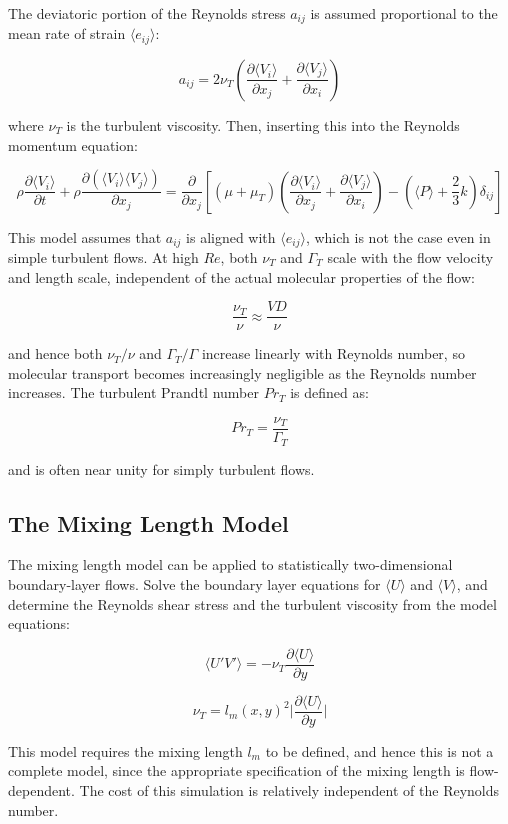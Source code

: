 \documentclass[10pt]{article}
\newcommand{\beq}{\begin{equation}}
\newcommand{\eeq}{\end{equation}}
\newcommand{\la}{\langle}
\newcommand{\ra}{\rangle}
\begin{document}
\begin{flushleft}
The deviatoric portion of the Reynolds stress \(a_{ij}\) is assumed proportional to the mean rate of strain \(\la e_{ij}\ra\):

\beq
a_{ij}=2\nu_T\left(\frac{\partial \la V_i\ra}{\partial x_j}+\frac{\partial \la V_j\ra}{\partial x_i}\right)
\eeq

where \(\nu_T\) is the turbulent viscosity. Then, inserting this into the Reynolds momentum equation:

\beq
\rho\frac{\partial \la V_i\ra}{\partial t}+\rho\frac{\partial(\la V_i\ra\la V_j\ra)}{\partial x_j}=\frac{\partial}{\partial x_j}\left\lbrack(\mu+\mu_T)\left(\frac{\partial\la V_i\ra}{\partial x_j}+\frac{\partial\la V_j\ra}{\partial x_i}\right)-\left(\la P\ra+\frac{2}{3}k\right)\delta_{ij}\right\rbrack
\eeq

This model assumes that \(a_{ij}\) is aligned with \(\la e_{ij}\ra\), which is not the case even in simple turbulent flows. At high \(Re\), both \(\nu_T\) and \(\Gamma_T\) scale with the flow velocity and length scale, independent of the actual molecular properties of the flow:

\beq
\frac{\nu_T}{\nu}\approx\frac{VD}{\nu}
\eeq

and hence both \(\nu_T/\nu\) and \(\Gamma_T/\Gamma\) increase linearly with Reynolds number, so molecular transport becomes increasingly negligible as the Reynolds number increases. The turbulent Prandtl number \(Pr_T\) is defined as:

\beq
Pr_T=\frac{\nu_T}{\Gamma_T}
\eeq

and is often near unity for simply turbulent flows. 




\subsection{The Mixing Length Model}
The mixing length model can be applied to statistically two-dimensional boundary-layer flows. Solve the boundary layer equations for \(\la U\ra\) and \(\la V\ra\), and determine the Reynolds shear stress and the turbulent viscosity from the model equations:

\beq
\la U'V'\ra=-\nu_T\frac{\partial\la U\ra}{\partial y}
\eeq

\beq
\nu_T=l_m(x,y)^2\biggr\rvert\frac{\partial\la U\ra}{\partial y}\biggr\rvert
\eeq

This model requires the mixing length \(l_m\) to be defined, and hence this is not a complete model, since the appropriate specification of the mixing length is flow-dependent. The cost of this simulation is relatively independent of the Reynolds number. 





\end{flushleft}
\end{document}
